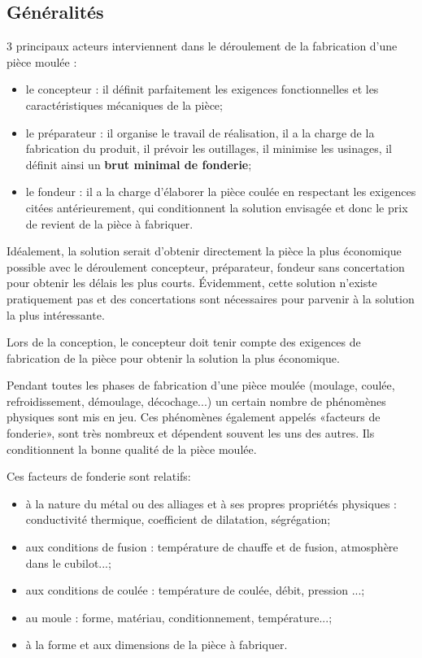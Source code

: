 \documentclass[11pt,oneside]{article}
\begin{document}
\subsection{Généralités}
3 principaux acteurs interviennent dans le déroulement de la fabrication d'une
pièce moulée : 
\begin{itemize}
 \item le concepteur : il définit parfaitement les exigences fonctionnelles et
les caractéristiques mécaniques de la pièce;
\item le préparateur : il organise le travail de réalisation, il a la charge de
la fabrication du produit, il prévoir les outillages, il minimise les usinages,
il définit ainsi un \textbf{brut minimal de fonderie};
\item le fondeur : il a la charge d'élaborer la pièce coulée en respectant les
exigences citées antérieurement, qui conditionnent la solution envisagée et
donc le prix de revient de la pièce à fabriquer. 
\end{itemize}

Idéalement, la solution serait d'obtenir directement la pièce la plus
économique possible avec le déroulement concepteur, préparateur, fondeur sans
concertation pour obtenir les délais les plus courts. Évidemment, cette
solution n'existe pratiquement pas et des concertations sont nécessaires pour
parvenir à la solution la plus intéressante.

Lors de la conception, le concepteur doit tenir compte des exigences de
fabrication de la pièce pour obtenir la solution la plus économique. 

Pendant toutes les phases de fabrication d'une pièce moulée (moulage, coulée,
refroidissement, démoulage, décochage...) un certain nombre de phénomènes
physiques sont mis en jeu. Ces phénomènes également appelés «facteurs de
fonderie», sont très nombreux et dépendent souvent les uns des autres. Ils
conditionnent la bonne qualité de la pièce moulée. 

Ces facteurs de fonderie sont relatifs: 
\begin{itemize}
 \item à la nature du métal ou des alliages et à ses propres propriétés
physiques : conductivité thermique, coefficient de dilatation, ségrégation;
\item aux conditions de fusion : température de chauffe et de fusion,
atmosphère dans le cubilot...; 
\item aux conditions de coulée : température de coulée, débit, pression ...;
\item au moule : forme, matériau, conditionnement, température...;
\item à la forme et aux dimensions de la pièce à fabriquer.
\end{itemize}
\end{document}
